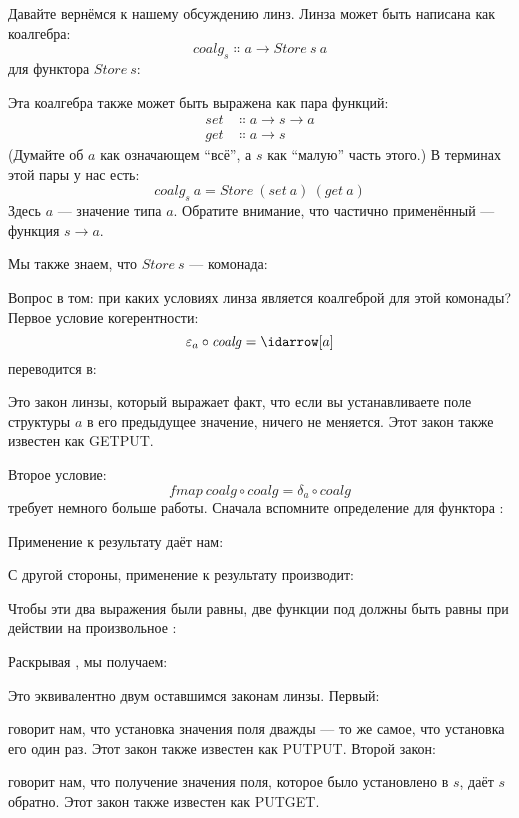 Давайте вернёмся к нашему обсуждению линз. Линза может быть написана как
коалгебра:
\[\mathit{coalg}_s \Colon a \to \mathit{Store}\ s\ a\]
для функтора $\mathit{Store}\ s$:

Эта коалгебра также может быть выражена как пара функций:
\begin{align*}
  \mathit{set} & \Colon a \to s \to a \\
  \mathit{get} & \Colon a \to s
\end{align*}
(Думайте об $a$ как означающем ``всё'', а $s$ как
``малую'' часть этого.) В терминах этой пары у нас есть:
\[\mathit{coalg}_s\ a = \mathit{Store}\ (\mathit{set}\ a)\ (\mathit{get}\ a)\]
Здесь $a$ --- значение типа $a$. Обратите внимание, что частично
применённый  --- функция $s \to a$.

Мы также знаем, что $\mathit{Store}\ s$ --- комонада:

Вопрос в том: при каких условиях линза является коалгеброй для этой
комонады? Первое условие когерентности:
\[\varepsilon_a \circ \mathit{coalg} = \idarrow[a]\]
переводится в:

Это закон линзы, который выражает факт, что если вы устанавливаете поле
структуры $a$ в его предыдущее значение, ничего не меняется.
Этот закон также известен как GETPUT.

Второе условие:
\[\mathit{fmap}\ \mathit{coalg} \circ \mathit{coalg} = \delta_a \circ \mathit{coalg}\]
требует немного больше работы. Сначала вспомните определение
 для функтора :

Применение  к результату  даёт нам:

С другой стороны, применение  к результату
 производит:

Чтобы эти два выражения были равны, две функции под
 должны быть равны при действии на произвольное :

Раскрывая , мы получаем:

Это эквивалентно двум оставшимся законам линзы. Первый:

говорит нам, что установка значения поля дважды --- то же самое, что установка
его один раз. Этот закон также известен как PUTPUT. Второй закон:

говорит нам, что получение значения поля, которое было установлено в $s$,
даёт $s$ обратно. Этот закон также известен как PUTGET.

